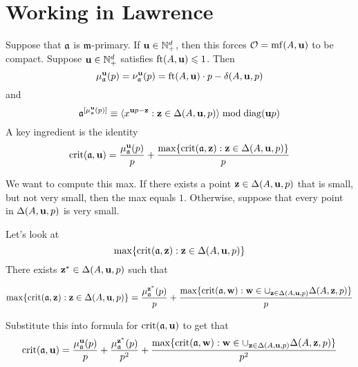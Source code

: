 \documentclass[11pt]{amsart}
\renewcommand{\!}[1]{{\color{red}\text{$\star$\,}#1\,$\star$}}
\begin{document}
\newpage

\newcommand{\diag}{\operatorname{diag}}
\newcommand{\crit}{\operatorname{crit}}

\section{Working in Lawrence}

Suppose that $\mathfrak{a}$ is $\mathfrak{m}$-primary.  If $\mathbf{u} \in \mathbb{N}^d_+$, then this forces $\mathcal{O} = \operatorname{mf}(A, \mathbf{u})$ to be compact.  Suppose $\mathbf{u} \in \mathbb{N}^d_+$ satisfies $\operatorname{ft}(A, \mathbf{u}) \leqslant 1$.  Then 
%
\[ \mu_{\mathfrak{a}}^{\mathbf{u}}(p) = \nu_{\mathfrak{a}}^{\mathbf{u}}(p) =  \operatorname{ft}(A, \mathbf{u}) \cdot p - \delta(A, \mathbf{u}, p) \] and 
 \[ \ideala^{[\mu_{\ideala}^{\vv{u}}(p) ]} \equiv \langle x^{\vv{u}p - \vv{z}} : \vv{z} \in \Delta(A, \vv{u}, p) \rangle \bmod \diag(\vv{u}p) \]
%
A key ingredient is the identity 
\[ \crit(\ideala ,\vv{u}) = \frac{ \mu_{\ideala}^{\vv{u}}(p)}{p} + \frac{\max \{ \crit(\ideala, \vv{z}) : \vv{z} \in \Delta(A, \vv{u}, p) \}}{p} \]

We want to compute this max.  If there exists a point $\mathbf{z} \in \Delta(A, \mathbf{u}, p)$ that is small, but not very small, then the max equals $1$.  Otherwise, suppose that every point in $\Delta(A, \mathbf{u}, p)$ is very small.  

Let's look at 
\[ \max \{ \crit(\ideala, \vv{z}) : \vv{z} \in \Delta(A, \vv{u}, p) \} \]
There exists $\mathbf{z}^{\ast} \in \Delta(A, \mathbf{u}, p)$ such that 

\[ \max \{ \crit(\ideala, \vv{z}) : \vv{z} \in \Delta(A, \vv{u}, p) \} = \frac{\mu_{\ideala}^{\vv{z}^{\ast}}(p)}{p} + \frac{\max \{  \crit(\ideala, \vv{w}) : \vv{w} \in \cup_{\vv{z} \in \Delta(A, \vv{u}, p)} \Delta(A, \vv{z}, p)\} }{p} \]

Substitute this into formula for $\crit(\ideala, \vv{u})$ to get that
%
\[
\crit(\ideala, \vv{u}) =  \frac{ \mu_{\ideala}^{\vv{u}}(p)}{p} +  \frac{ \mu_{\ideala}^{\vv{z}^{\ast}}(p)}{p^2} + \frac{\max \{  \crit(\ideala, \vv{w}) : \vv{w} \in \cup_{\vv{z} \in \Delta(A, \vv{u}, p)} \Delta(A, \vv{z}, p)\} }{p^2}
\]
%


\newcommand{\witt}{\mathfrak{W}}

\end{document}
